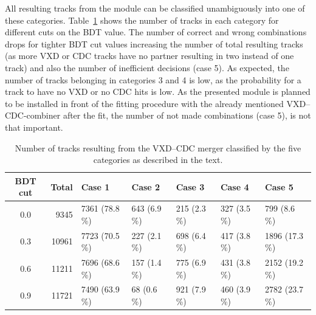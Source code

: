 All resulting tracks from the module can be classified unambiguously into one of these categories. Table~\ref{tab-vxd-cdc-cases} shows the number of tracks in each category for different cuts on the BDT value. The number of correct and wrong combinations drops for tighter BDT cut values increasing the number of total resulting tracks (as more VXD or CDC tracks have no partner resulting in two instead of one track) and also the number of inefficient decisions (case 5). As expected, the number of tracks belonging in categories 3 and 4 is low, as the probability for a track to have no VXD or no CDC hits is low. As the presented module is planned to be installed in front of the fitting procedure with the already mentioned VXD--CDC-combiner after the fit, the number of not made combinations (case 5), is not that important.

\begin{table}
  \centering
  \caption{Number of tracks resulting from the VXD--CDC merger classified by the five categories as described in the text.}
  \hspace*{-0.55cm}
  \begin{tabular}{crlllll}
    \toprule
    BDT cut &  Total &         Case 1 &       Case 2 &       Case 3 &       Case 4 &         Case 5 \\
    \midrule
	0.0 &   9345 &  7361 (78.8 \%) &  643 (6.9 \%) &  215 (2.3 \%) &  327 (3.5 \%) &    799 (8.6 \%) \\
	0.3 &  10961 &  7723 (70.5 \%) &  227 (2.1 \%) &  698 (6.4 \%) &  417 (3.8 \%) &  1896 (17.3 \%) \\
	0.6 &  11211 &  7696 (68.6 \%) &  157 (1.4 \%) &  775 (6.9 \%) &  431 (3.8 \%) &  2152 (19.2 \%) \\
	0.9 &  11721 &  7490 (63.9 \%) &   68 (0.6 \%) &  921 (7.9 \%) &  460 (3.9 \%) &  2782 (23.7 \%) \\
    \bottomrule
  \end{tabular}
  \label{tab-vxd-cdc-cases}
\end{table}

